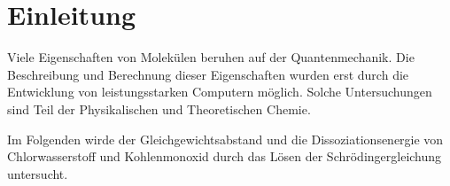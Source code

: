 


\section{Einleitung}


Viele Eigenschaften von Molekülen beruhen auf der Quantenmechanik. Die Beschreibung und Berechnung dieser Eigenschaften wurden erst durch die Entwicklung von leistungsstarken Computern möglich. Solche Untersuchungen sind Teil der Physikalischen und Theoretischen Chemie.

Im Folgenden wirde der Gleichgewichtsabstand und die Dissoziationsenergie von Chlorwasserstoff und Kohlenmonoxid durch das Lösen der Schrödingergleichung untersucht. 









